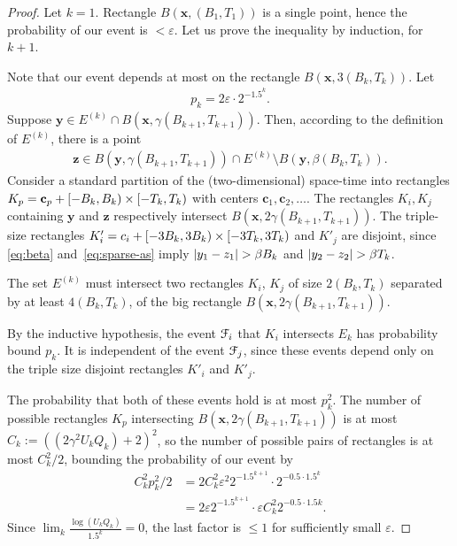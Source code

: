 \documentclass[12pt]{memoir}
\renewcommand{\le}{\leq}
\renewcommand{\vek}[1]{\mathbf{#1}}
\def\B{B}
\def\U{U}
\newcommand{\Q}{Q}
\newcommand{\Tu}{T}
\begin{document}
\begin{proof}
Let \( k=1 \).
Rectangle \( B(\vek{x},(\B_{1}, \Tu_{1})) \) is a single point, hence
the probability of our event is \( <\varepsilon \).
Let us prove the inequality by induction, for \( k+1 \).

Note that our 
event depends at most on the rectangle \( B(\vek{x},3(\B_{k}, \Tu_{k})) \).
Let
\begin{align*}
   p_{k}=2\varepsilon\cdot 2^{-1.5^{k}}.
\end{align*}
Suppose \( \vek{y} \in E^{(k)}\cap B(\vek{x},\gamma(\B_{k+1}, \Tu_{k+1})  ) \).
Then, according to the definition of \( E^{(k)} \),  there is a point
\begin{align}\label{eq:sparse-as}
 \vek{z} \in
 B(\vek{y},\gamma(\B_{k+1},\Tu_{k+1}))\cap E^{(k)}\setminus B(\vek{y},\beta(\B_{k}, \Tu_{k})).
 \end{align}
Consider a standard partition of the (two-dimensional) space-time into
rectangles \( K_{p}=\vek{c}_{p}+\lint{-\B_{k}}{\B_{k}}\times \lint{-\Tu_{k}}{\Tu_{k}} \)
with centers \( \vek{c}_{1},\vek{c}_{2},\dots \).
The rectangles \( K_{i},K_{j} \) containing \( \vek{y} \) and \( \vek{z} \)
respectively intersect \( B(\vek{x}, 2\gamma(\B_{k+1}, \Tu_{k+1})) \).
The triple-size rectangles 
\( K'_{i}=c_{i} + \lint{-3\B_{k}}{3\B_{k}}\times \lint{-3\Tu_{k}}{3\Tu_{k}} \) and
\( K'_{j} \) are disjoint, since \eqref{eq:beta} and~\eqref{eq:sparse-as} imply
 \( \abs{y_{1} - z_{1}}>\beta\B_{k} \) and \( \abs{y_{2} - z_{2}}>\beta\Tu_{k} \).

The set \( E^{(k)} \) must intersect two rectangles \( K_{i} \),
\( K_{j} \) of size \( 2(\B_{k}, \Tu_{k}) \) separated by at least \( 4(\B_{k}, \Tu_{k}) \),
of the big rectangle \( B(\vek{x},2\gamma(\B_{k+1}, \Tu_{k+1})) \).

By the inductive hypothesis, the event \( \mathcal{F}_{i} \) that
\( K_{i} \) intersects \( E_{k} \) has probability bound \( p_{k} \).
It is independent of the event \( \mathcal{F}_{j} \), since these events depend
only on the triple size disjoint rectangles \( K'_{i} \) and \( K'_{j} \).

The probability that both of these events hold is at most \( p_{k}^{2} \).
The number of possible rectangles
\( K_{p} \) intersecting \( B(\vek{x},2\gamma(\B_{k+1}, \Tu_{k+1})) \) is
at most
\( C_{k}:=((2\gamma^{2}\U_{k} \Q_{k})+2)^{2} \), so the number of possible pairs of rectangles
is at most \( C_{k}^{2}/2 \), bounding the probability of our event by
 \begin{align*}
   C_{k}^{2}p_{k}^{2}/2
    &=
      2 C_{k}^{2}\varepsilon^{2} 2^{-1.5^{k+1}}\cdot 2^{-0.5\cdot 1.5^{k}}
   \\ &=2\varepsilon 2^{-1.5^{k+1}} \cdot \varepsilon
        C_{k}^{2}2^{-0.5\cdot 1.5{k}}.
 \end{align*}
Since \( \lim_{k}\frac{\log{(\U_{k} \Q_{k})}}{1.5^k}=0 \),
the last factor is \( \le 1 \) for sufficiently small  \( \varepsilon \).
\end{proof}
\end{document}
